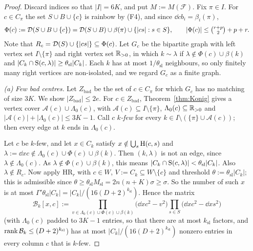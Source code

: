 \begin{proof}
Discard indices so that $|I|=6K$, and put $M:=M(\mathcal F)$. Fix $\pi\in I$. For $c\in C_\pi$ the set $S\cup B\cup\{c\}$ is
rainbow by (F4), and since $\dd c{b_i}=\beta_i(\pi)$,
\[
\Phi(c):=\mathcal{D}(S\cup B\cup\{c\})=\mathcal{D}(S\cup B)\cup\beta(\pi)\cup\{|cs|:s\in S\},\qquad|\Phi(c)|\le\tbinom{r+p}2+p+r .
\]
Note that $R_c=\mathcal{D}(S)\cup\{|cs|\}\subseteq\Phi(c)$. Let $G_c$ be the bipartite graph with left vertex set $I\setminus\{\pi\}$ and
right vertex set $\mathbb{R}_{>0}$, in which $k\sim\lambda$ if $\lambda\notin\Phi(c)\cup\beta(k)$ and
$|C_k\cap\mathrm{S}(c,\lambda)|\ge\theta_{\mathrm{sl}}|C_k|$. Each $k$ has at most $1/\theta_{\mathrm{sl}}$ neighbours, so only finitely many
right vertices are non-isolated, and we regard $G_c$ as a finite graph.

\emph{(a) Few bad centres.} Let $Z_{\mathrm{bad}}$ be the set of $c\in C_\pi$ for which $G_c$ has no matching of size $3K$.
We show $|Z_{\mathrm{bad}}|\le2e$. For $c\in Z_{\mathrm{bad}}$, Theorem~\ref{thm:Konig} gives a vertex cover
$\mathcal A(c)\cup\Lambda_0(c)$, with $\mathcal A(c)\subseteq I\setminus\{\pi\}$, $\Lambda_0(c)\subseteq\mathbb{R}_{>0}$ and
$|\mathcal A(c)|+|\Lambda_0(c)|\le3K-1$. Call $c$ \emph{$k$-few} for every $k\in I\setminus(\{\pi\}\cup\mathcal A(c))$; then every
edge at $k$ ends in $\Lambda_0(c)$.

Let $c$ be $k$-few, and let $x\in C_k$ satisfy $x\notin\bigcup_s\mathrm{H}(c,s)$ and
$\lambda:=\dd xc\notin\Lambda_0(c)\cup\Phi(c)\cup\beta(k)$. Then $(k,\lambda)$ is not an edge, since $\lambda\notin\Lambda_0(c)$.
As $\lambda\notin\Phi(c)\cup\beta(k)$, this means $|C_k\cap\mathrm{S}(c,\lambda)|<\theta_{\mathrm{sl}}|C_k|$. Also $\lambda\notin R_c$. Now apply
HR$_r$ with $c\in W$, $V:=C_k\subseteq W\setminus\{c\}$ and threshold $\theta:=\theta_{\mathrm{sl}}|C_k|$; this is admissible since
$\theta\ge\theta_{\mathrm{sl}}M_{\mathrm{sl}}=2n(n+K)\sigma\ge\sigma$. So the number of such $x$ is at most
$\Gamma'\theta_{\mathrm{sl}}|C_k|=|C_k|/(16(D+2)^{k_{\mathrm{sl}}})$. Hence the matrix
\[
\mathcal B_k[x,c]:=\prod_{v\in\Lambda_0(c)\cup\Phi(c)\cup\beta(k)}\bigl(\dd xc^2-v^2\bigr)\prod_{s\in S}\bigl(\dd xc^2-\dd xs^2\bigr)
\]
(with $\Lambda_0(c)$ padded to $3K-1$ entries, so that there are at most $k_{\mathrm{sl}}$ factors, and
$\operatorname{rank}\mathcal B_k\le(D+2)^{k_{\mathrm{sl}}}$) has at most $|C_k|/(16(D+2)^{k_{\mathrm{sl}}})$ nonzero entries in every column $c$ that is
$k$-few.


\end{proof}
